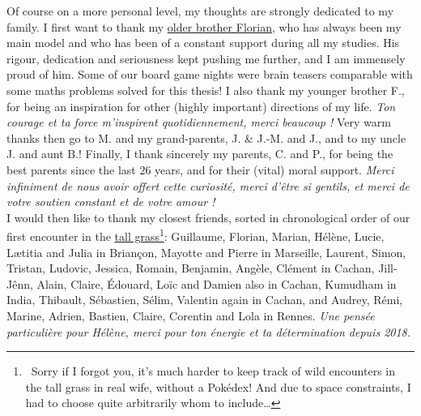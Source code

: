 \begin{acknowledgements}
Of course on a more personal level, my thoughts are strongly dedicated to my family.
%
I first want to thank my \href{https://paris-sorbonne.academia.edu/FBesson}{older brother Florian}, who has always been my main model and who has been of a constant support during all my studies.
His rigour, dedication and seriousness kept pushing me further, and I am immensely proud of him.
Some of our board game nights were brain teasers comparable with some maths problems solved for this thesis!
%
I also thank my younger brother F., for being an inspiration for other (highly important) directions of my life. \emph{Ton courage et ta force m'inspirent quotidiennement, merci beaucoup !}
Very warm thanks then go to M. and my grand-parents, J. \& J.-M. and J., and to my uncle J. and aunt B.!
Finally, I thank sincerely my parents, C. and P., for being the best parents since the last $26$ years, and for their (vital) moral support.
\emph{Merci infiniment de nous avoir offert cette curiosité, merci d'être si gentils, et merci de votre soutien constant et de votre amour !}
\\
\indent
I would then like to thank my closest friends, sorted in chronological order of our first encounter in the \href{https://bulbapedia.bulbagarden.net/wiki/Tall_grass}{tall grass}\footnote{~Sorry if I forgot you, it's much harder to keep track of wild encounters in the tall grass in real wife, without a Pokédex! And due to space constraints, I had to choose quite arbitrarily whom to include\dots}: Guillaume, Florian, Marian, Hélène, Lucie, Lætitia and Julia in Briançon, Mayotte and Pierre in Marseille, Laurent, Simon, Tristan, Ludovic, Jessica, Romain, Benjamin, Angèle, Clément in Cachan, Jill-Jênn, Alain, Claire, Édouard, Loïc and Damien also in Cachan, Kumudham in India, Thibault, Sébastien, Sélim, Valentin again in Cachan, and Audrey, Rémi, Marine, Adrien, Bastien, Claire, Corentin and Lola in Rennes.
\emph{Une pensée particulière pour Hélène, merci pour ton énergie et ta détermination depuis 2018.}


\end{acknowledgements}
